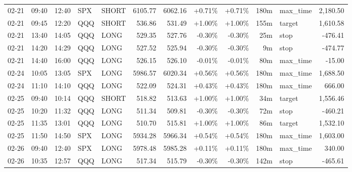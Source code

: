 \documentclass[11pt,a4paper]{article}
\begin{document}
\begin{center}
\begin{longtable}{>{\color{txtmain}}l l l l l r r r r r >{\color{txtmain}}l r}
02-21 & 09:40 & 12:40 & SPX & SHORT & 6105.77 & 6062.16 & \textcolor{wingreen}{+0.71\%} & \textcolor{wingreen}{+0.71\%} & 180m & max\_time & \textcolor{wingreen}{2,180.50} \\
02-21 & 09:45 & 12:20 & QQQ & SHORT & 536.86 & 531.49 & \textcolor{wingreen}{+1.00\%} & \textcolor{wingreen}{+1.00\%} & 155m & target & \textcolor{wingreen}{1,610.58} \\
02-21 & 13:40 & 14:05 & QQQ & LONG & 529.35 & 527.76 & \textcolor{lossred}{-0.30\%} & \textcolor{lossred}{-0.30\%} & 25m & stop & \textcolor{lossred}{-476.41} \\
02-21 & 14:20 & 14:29 & QQQ & LONG & 527.52 & 525.94 & \textcolor{lossred}{-0.30\%} & \textcolor{lossred}{-0.30\%} & 9m & stop & \textcolor{lossred}{-474.77} \\
02-21 & 14:40 & 16:00 & QQQ & LONG & 526.15 & 526.10 & \textcolor{lossred}{-0.01\%} & \textcolor{lossred}{-0.01\%} & 80m & max\_time & \textcolor{lossred}{-15.00} \\
02-24 & 10:05 & 13:05 & SPX & LONG & 5986.57 & 6020.34 & \textcolor{wingreen}{+0.56\%} & \textcolor{wingreen}{+0.56\%} & 180m & max\_time & \textcolor{wingreen}{1,688.50} \\
02-24 & 11:10 & 14:10 & QQQ & LONG & 522.09 & 524.31 & \textcolor{wingreen}{+0.43\%} & \textcolor{wingreen}{+0.43\%} & 180m & max\_time & \textcolor{wingreen}{666.00} \\
02-25 & 09:40 & 10:14 & QQQ & SHORT & 518.82 & 513.63 & \textcolor{wingreen}{+1.00\%} & \textcolor{wingreen}{+1.00\%} & 34m & target & \textcolor{wingreen}{1,556.46} \\
02-25 & 10:20 & 11:32 & QQQ & LONG & 511.34 & 509.81 & \textcolor{lossred}{-0.30\%} & \textcolor{lossred}{-0.30\%} & 72m & stop & \textcolor{lossred}{-460.21} \\
02-25 & 11:35 & 13:01 & QQQ & LONG & 510.70 & 515.81 & \textcolor{wingreen}{+1.00\%} & \textcolor{wingreen}{+1.00\%} & 86m & target & \textcolor{wingreen}{1,532.10} \\
02-25 & 11:50 & 14:50 & SPX & LONG & 5934.28 & 5966.34 & \textcolor{wingreen}{+0.54\%} & \textcolor{wingreen}{+0.54\%} & 180m & max\_time & \textcolor{wingreen}{1,603.00} \\
02-26 & 09:40 & 12:40 & SPX & LONG & 5978.48 & 5985.28 & \textcolor{wingreen}{+0.11\%} & \textcolor{wingreen}{+0.11\%} & 180m & max\_time & \textcolor{wingreen}{340.00} \\
02-26 & 10:35 & 12:57 & QQQ & LONG & 517.34 & 515.79 & \textcolor{lossred}{-0.30\%} & \textcolor{lossred}{-0.30\%} & 142m & stop & \textcolor{lossred}{-465.61} \\

\end{longtable}
\end{center}
\end{document}
